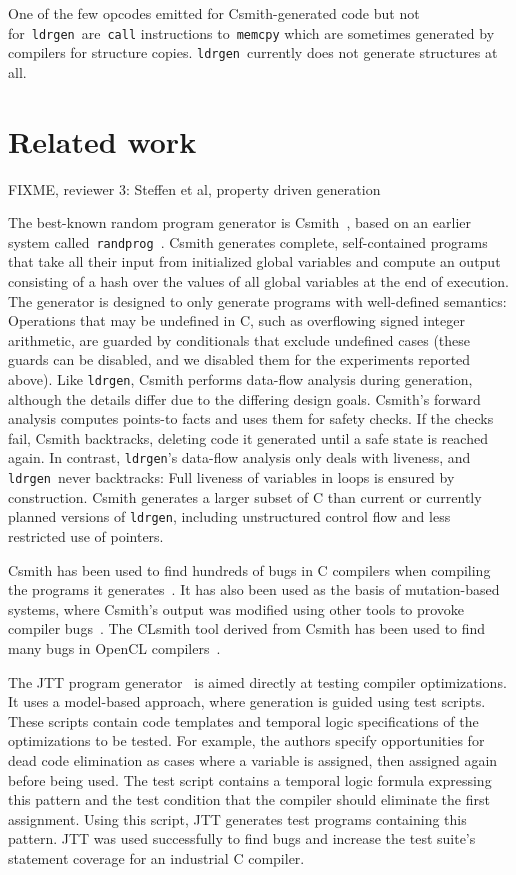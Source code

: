 \documentclass{llncs}
\newcommand\ldrgen{\texttt{ldrgen}}
\begin{document}
One of the few opcodes emitted for Csmith-generated code but not
for~\ldrgen\ are~\verb|call| instructions to~\verb|memcpy| which are
sometimes generated by compilers for structure copies. \ldrgen\ currently
does not generate structures at all.


\section{Related work}

FIXME, reviewer 3: Steffen et al, property driven generation

The best-known random program generator is Csmith~\cite{csmith-2011}, based
on an earlier system
called~\texttt{randprog}~\cite{eide.regehr-2008,randprog-2007}. Csmith
generates complete, self-contained programs that take all their input from
initialized global variables and compute an output consisting of a hash over
the values of all global variables at the end of execution. The generator is
designed to only generate programs with well-defined semantics: Operations
that may be undefined in C, such as overflowing signed integer arithmetic,
are guarded by conditionals that exclude undefined cases (these guards can
be disabled, and we disabled them for the experiments reported above). Like
\ldrgen, Csmith performs data-flow analysis during generation, although the
details differ due to the differing design goals. Csmith's forward analysis
computes points-to facts and uses them for safety checks. If the checks
fail, Csmith backtracks, deleting code it generated until a safe state is
reached again. In contrast, \ldrgen's data-flow analysis only deals with
liveness, and \ldrgen\ never backtracks: Full liveness of variables in loops
is ensured by construction. Csmith generates a larger subset of C than
current or currently planned versions of \ldrgen, including unstructured
control flow and less restricted use of pointers.

Csmith has been used to find hundreds of bugs in C compilers when compiling
the programs it generates~\cite{csmith-2011}. It has also been used as the
basis of mutation-based systems, where Csmith's output was modified using
other tools to provoke compiler bugs~\cite{le.etal-2014}. The CLsmith tool
derived from Csmith has been used to find many bugs in OpenCL
compilers~\cite{lidbury.etal-2015}.


The JTT program generator~\cite{zhao.etal-2009} is aimed directly at testing
compiler optimizations. It uses a model-based approach, where generation is
guided using test scripts. These scripts contain code templates and temporal
logic specifications of the optimizations to be tested. For example, the
authors specify opportunities for dead code elimination as cases where a
variable is assigned, then assigned again before being used. The test script
contains a temporal logic formula expressing this pattern and the test
condition that the compiler should eliminate the first assignment. Using
this script, JTT generates test programs containing this pattern. JTT was
used successfully to find bugs and increase the test suite's statement
coverage for an industrial C compiler.
\end{document}
